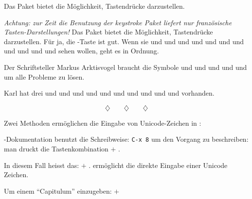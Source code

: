 \label{cpftestbeta}

Das Paket  bietet die Möglichkeit,
Tastendrücke darzustellen.


\emph{Achtung: zur Zeit die Benutzung der keystroke Paket
liefert nur französische Tasten-Darstellungen!} Das
Paket  bietet die Möglichkeit,
Tastendrücke darzustellen. Für ja,
die \hbox{-Taste} ist gut.
Wenn sie \Del{} und %
\Ins{}%
und %
\Esc{}%
und %
\Shift{}%
und %
\Ctrl{}%
und %
\Home{}%
und %
\End{}%
und %
\PgUp{}%
und %
\PgDown{}%
und %
\PrtScroll{}%
und %
\Spacebar{}%
und %
\Break{} sehen wollen, geht es in Ordnung.

Der Schriftsteller Markus Arktisvogel
braucht die Symbole %
\Esc{}%
und %
\Shift{}%
und %
\Ctrl{}%
und %
\Alt{}%
und %
\Return{}%
und %
\Spacebar{}%
um alle Probleme zu lösen.

Karl hat drei \Spacebar{}%
und %
\Return{}%
und %
\BSpace{}%
und %
\Tab{}%
und %
\Alt{}%
und %
\AltGr{}%
und %
\NumLock{}%
und %
\UArrow{}%
und %
\DArrow{}%
und %
\LArrow{}%
und %
\RArrow{} vorhanden.

$$\diamondsuit\qquad\diamondsuit\qquad\diamondsuit$$

Zwei Methoden ermöglichen die Eingabe von
Unicode-Zeichen in :

-Dokumentation benutzt die Schreibweise: %
\texttt{C-x 8}
um den Vorgang zu beschreiben: man druckt die Tastenkombination
\Ctrl$+$%
\space%
.

In diesem Fall heisst das: %
\Ctrl$+$%
\space%
%
\Return{}%
%
\Return . ermöglicht die direkte Eingabe einer
Unicode Zeichen.

Um einem \enquote{Capitulum} einzugeben: %
\hbox{\Ctrl$+$}%
%
\Return{}%
%
%
%
%
\space%
\Return{}%

%

